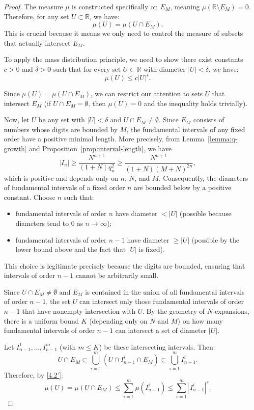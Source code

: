 \documentclass[12pt]{article}
\numberwithin{equation}{section}
\begin{document}
\begin{proof}
The measure $\mu$ is constructed specifically on $E_M$, meaning $\mu(\mathbb{R} \setminus E_M) = 0$. Therefore, for any set $U \subset \mathbb{R}$, we have:
\[
\mu(U) = \mu(U \cap E_M).
\]
This is crucial because it means we only need to control the measure of subsets that actually intersect $E_M$.

To apply the mass distribution principle, we need to show there exist constants $c > 0$ and $\delta > 0$ such that for every set $U \subset \mathbb{R}$ with diameter $|U| < \delta$, we have:
\[
\mu(U) \leq c |U|^s.
\]

Since $\mu(U) = \mu(U \cap E_M)$, we can restrict our attention to sets $U$ that intersect $E_M$ (if $U \cap E_M = \emptyset$, then $\mu(U) = 0$ and the inequality holds trivially).

{Now, let $U$ be any set with $|U| < \delta$ and $U \cap E_M \neq \emptyset$. Since $E_M$ consists of numbers whose digits are bounded by $M$, the fundamental intervals of any fixed order have a positive minimal length. More precisely, from Lemma~\ref{lemma:q-growth} and Proposition~\ref{prop:interval-length}, we have
\[
|I_n| \ge \frac{N^{n+1}}{(1+N)q_n^2} \ge \frac{N^{n+1}}{(1+N)(M+N)^{2n}},
\]
which is positive and depends only on $n$, $N$, and $M$. Consequently, the diameters of fundamental intervals of a fixed order $n$ are bounded below by a positive constant.
%
Choose $n$ such that:
\begin{itemize}
    \item[-] fundamental intervals of order $n$ have diameter $< |U|$ (possible because diameters tend to $0$ as $n \to \infty$);
    \item[-] fundamental intervals of order $n-1$ have diameter $\geq |U|$ (possible by the lower bound above and the fact that $|U|$ is fixed).
\end{itemize}
%
This choice is legitimate precisely because the digits are bounded, ensuring that intervals of order $n-1$ cannot be arbitrarily small. }

Since $U \cap E_M \neq \emptyset$ and $E_M$ is contained in the union of all fundamental intervals of order $n-1$, the set $U$ can intersect only those fundamental intervals of order $n-1$ that have nonempty intersection with $U$. By the geometry of $N$-expansions, there is a uniform bound $K$ (depending only on $N$ and $M$) on how many fundamental intervals of order $n-1$ can intersect a set of diameter $|U|$.

Let $I_{n-1}^1, \ldots, I_{n-1}^m$ (with $m \leq K$) be these intersecting intervals. Then:
\[
U \cap E_M \subset \bigcup_{i=1}^m (U \cap I_{n-1}^i \cap E_M) \subset \bigcup_{i=1}^m I_{n-1}^i.
\]
Therefore{, by \eqref{4.2'}}:
\[
\mu(U) = \mu(U \cap E_M) \leq \sum_{i=1}^m \mu(I_{n-1}^i) \leq \sum_{i=1}^m |I_{n-1}^i|^s.
\]


\end{proof}
\end{document}
